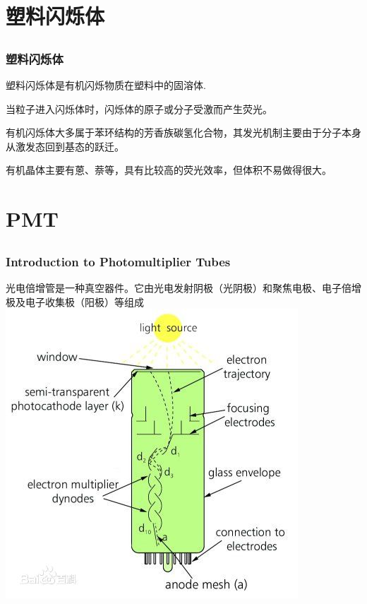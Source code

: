 \documentclass[notheorems, aspectratio=54]{beamer}
\begin{document}
\section{塑料闪烁体}
\subsection{}
\begin{frame}
\frametitle{塑料闪烁体}
塑料闪烁体是有机闪烁物质在塑料中的固溶体.

当粒子进入闪烁体时，闪烁体的原子或分子受激而产生荧光。

有机闪烁体大多属于苯环结构的芳香族碳氢化合物，其发光机制主要由于分子本身从激发态回到基态的跃迁。

有机晶体主要有蒽、萘等，具有比较高的荧光效率，但体积不易做得很大。

\end{frame}


\section{PMT}
\subsection{}
\begin{frame}
\frametitle{Introduction to Photomultiplier Tubes}
光电倍增管是一种真空器件。它由光电发射阴极（光阴极）和聚焦电极、电子倍增极及电子收集极（阳极）等组成
\centering
\includegraphics[scale=0.4]{../pic/pmt.jpg} 

\end{frame}
\end{document}
